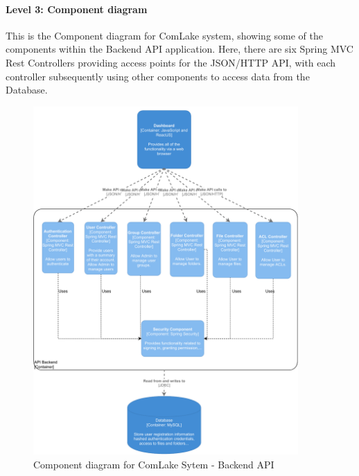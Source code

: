 \paragraph{Level 3: Component diagram}
This is the Component diagram for ComLake system, showing some of the components within the Backend API application. Here, there are six Spring MVC Rest Controllers providing access points for the JSON/HTTP API, with each controller subsequently using other components to access data from the Database.
\begin{figure}[H]
    \centering
    \includegraphics[width=0.9\textwidth]{images/C3.pdf}
    \caption{Component diagram for ComLake Sytem - Backend API}
    \label{fig:C3}
\end{figure}

